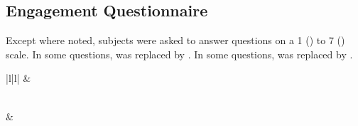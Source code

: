 \documentclass[letterpaper,10pt,english]{sphinxmanual}
\begin{document}
\subsection{Engagement Questionnaire}
\label{\detokenize{Data_Definations_Phase1B:engagement-questionnaire}}
Except where noted, subjects were asked to answer questions on a 1 () to 7 () scale. In some questions,  was
replaced by . In some questions,  was replaced by
 .


\begin{savenotes}\sphinxatlongtablestart\begin{longtable}{|l|l|}
\hline
{}\relax &\relax \\
\hline
\endfirsthead

%
{}\\
\hline
{}\relax &\relax \\
\hline
\endhead

\hline
{}\\
\endfoot

\endlastfoot


\end{longtable}
\end{savenotes}
\end{document}
